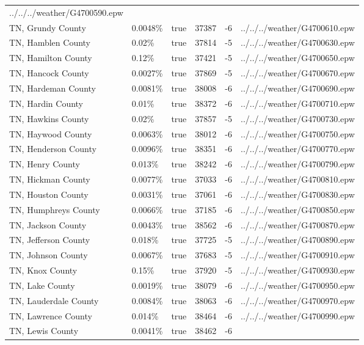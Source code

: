 \begin{longtable}[]{@{}llllll@{}}
../../../weather/G4700590.epw \\
TN, Grundy County & 0.0048\% & true & 37387 & -6 &
../../../weather/G4700610.epw \\
TN, Hamblen County & 0.02\% & true & 37814 & -5 &
../../../weather/G4700630.epw \\
TN, Hamilton County & 0.12\% & true & 37421 & -5 &
../../../weather/G4700650.epw \\
TN, Hancock County & 0.0027\% & true & 37869 & -5 &
../../../weather/G4700670.epw \\
TN, Hardeman County & 0.0081\% & true & 38008 & -6 &
../../../weather/G4700690.epw \\
TN, Hardin County & 0.01\% & true & 38372 & -6 &
../../../weather/G4700710.epw \\
TN, Hawkins County & 0.02\% & true & 37857 & -5 &
../../../weather/G4700730.epw \\
TN, Haywood County & 0.0063\% & true & 38012 & -6 &
../../../weather/G4700750.epw \\
TN, Henderson County & 0.0096\% & true & 38351 & -6 &
../../../weather/G4700770.epw \\
TN, Henry County & 0.013\% & true & 38242 & -6 &
../../../weather/G4700790.epw \\
TN, Hickman County & 0.0077\% & true & 37033 & -6 &
../../../weather/G4700810.epw \\
TN, Houston County & 0.0031\% & true & 37061 & -6 &
../../../weather/G4700830.epw \\
TN, Humphreys County & 0.0066\% & true & 37185 & -6 &
../../../weather/G4700850.epw \\
TN, Jackson County & 0.0043\% & true & 38562 & -6 &
../../../weather/G4700870.epw \\
TN, Jefferson County & 0.018\% & true & 37725 & -5 &
../../../weather/G4700890.epw \\
TN, Johnson County & 0.0067\% & true & 37683 & -5 &
../../../weather/G4700910.epw \\
TN, Knox County & 0.15\% & true & 37920 & -5 &
../../../weather/G4700930.epw \\
TN, Lake County & 0.0019\% & true & 38079 & -6 &
../../../weather/G4700950.epw \\
TN, Lauderdale County & 0.0084\% & true & 38063 & -6 &
../../../weather/G4700970.epw \\
TN, Lawrence County & 0.014\% & true & 38464 & -6 &
../../../weather/G4700990.epw \\
TN, Lewis County & 0.0041\% & true & 38462 & -6 &

\end{longtable}
